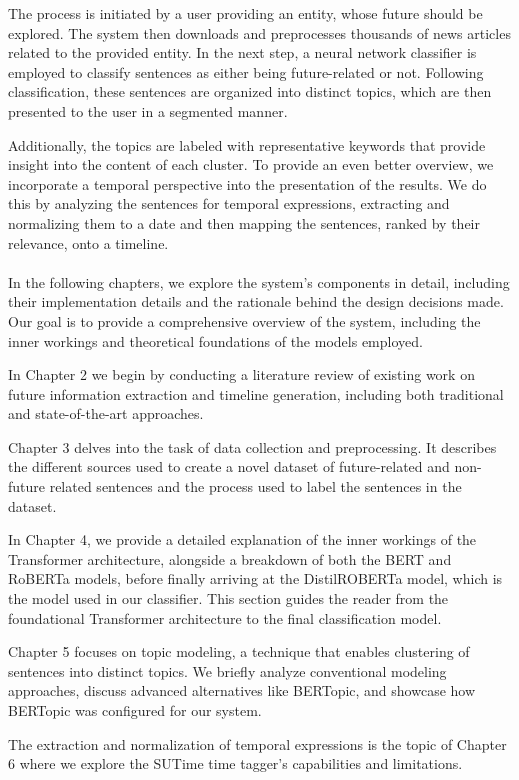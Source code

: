 \documentclass[12pt,oneside,bibtotoc,liststotoc]{scrbook}
\begin{document}
The process is initiated by a user providing an entity, whose future should be explored. The system then downloads and preprocesses thousands of news articles related to the provided entity. In the next step, a neural network classifier is employed to classify sentences as either being future-related or not. Following classification, these sentences are organized into distinct topics, which are then presented to the user in a segmented manner.

Additionally, the topics are labeled with representative keywords that provide insight into the content of each cluster. To provide an even better overview, we incorporate a temporal perspective into the presentation of the results. We do this by analyzing the sentences for temporal expressions, extracting and normalizing them to a date and then mapping the sentences, ranked by their relevance, onto a timeline.
\\\\
In the following chapters, we explore the system's components in detail, including their implementation details and the rationale behind the design decisions made. Our goal is to provide a comprehensive overview of the system, including the inner workings and theoretical foundations of the models employed.

In Chapter 2 we begin by conducting a literature review of existing work on future information extraction and timeline generation, including both traditional and state-of-the-art approaches.

Chapter 3 delves into the task of data collection and preprocessing. It describes the different sources used to create a novel dataset of future-related and non-future related sentences and the process used to label the sentences in the dataset.

In Chapter 4, we provide a detailed explanation of the inner workings of the Transformer architecture, alongside a breakdown of both the BERT and RoBERTa models, before finally arriving at the DistilROBERTa model, which is the model used in our classifier. This section guides the reader from the foundational Transformer architecture to the final classification model.

Chapter 5 focuses on topic modeling, a technique that enables clustering of sentences into distinct topics. We briefly analyze conventional modeling approaches, discuss advanced alternatives like BERTopic, and showcase how BERTopic was configured for our system.

The extraction and normalization of temporal expressions is the topic of Chapter 6 where we explore the SUTime time tagger's capabilities and limitations.
\end{document}
